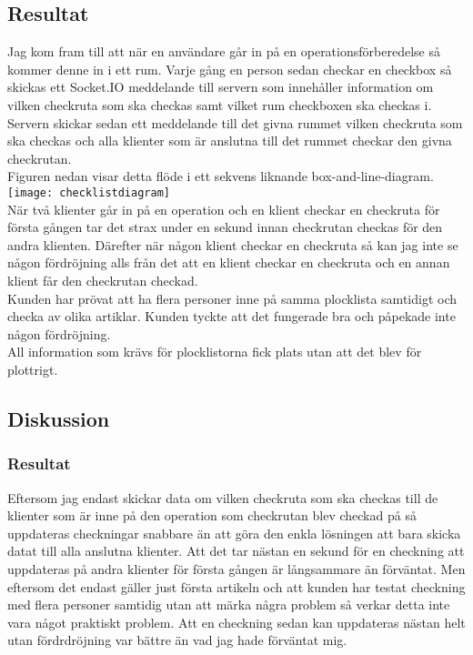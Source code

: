 \subsection{Resultat}
Jag kom fram till att när en användare går in på en operationsförberedelse så kommer denne in i ett rum. Varje gång en person sedan checkar en checkbox så skickas ett Socket.IO meddelande till servern som innehåller information om vilken checkruta som ska checkas samt vilket rum checkboxen ska checkas i. Servern skickar sedan ett meddelande till det givna rummet vilken checkruta som ska checkas och alla klienter som är anslutna till det rummet checkar den givna checkrutan. \\

Figuren nedan visar detta flöde i ett sekvens liknande box-and-line-diagram.
\texttt{[image: checklistdiagram]}\\

När två klienter går in på en operation och en klient checkar en checkruta för första gången tar det strax under en sekund innan checkrutan checkas för den andra klienten. Därefter när någon klient checkar en checkruta så kan jag inte se någon fördröjning alls från det att en klient checkar en checkruta och en annan klient får den checkrutan checkad.\\

Kunden har prövat att ha flera personer inne på samma plocklista samtidigt och checka av olika artiklar. Kunden tyckte att det fungerade bra och påpekade inte någon fördröjning. \\

All information som krävs för plocklistorna fick plats utan att det blev för plottrigt.

\subsection{Diskussion}
\subsubsection{Resultat}
Eftersom jag endast skickar data om vilken checkruta som ska checkas till de klienter som är inne på den operation som checkrutan blev checkad på så uppdateras checkningar snabbare än att göra den enkla lösningen att bara skicka datat till alla anslutna klienter. Att det tar nästan en sekund för en checkning att uppdateras på andra klienter för första gången är långsammare än förväntat. Men eftersom det endast gäller just första artikeln och att kunden har testat checkning med flera personer samtidig utan att märka några problem så verkar detta inte vara något praktiskt problem. Att en checkning sedan kan uppdateras nästan helt utan fördrdröjning var bättre än vad jag hade förväntat mig.

